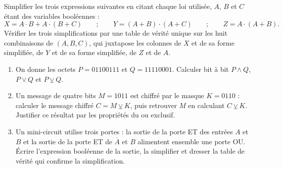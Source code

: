 \begin{exercice}
Simplifier les trois expressions suivantes en citant chaque loi utilisée, $A$, $B$ et $C$ étant des variables booléennes :
\[
X = A \cdot B + A \cdot (B + C) \qquad ; \qquad Y = (A + B) \cdot (A + C) \qquad ; \qquad Z = A \cdot (A + B).
\]
Vérifier les trois simplifications par une table de vérité unique sur les huit combinaisons de $(A, B, C)$, qui juxtapose les colonnes de $X$ et de sa forme simplifiée, de $Y$ et de sa forme simplifiée, de $Z$ et de $A$.
\end{exercice}

\begin{exercice}
\begin{enumerate}
\item On donne les octets $P = 01100111$ et $Q = 11110001$. Calculer bit à bit $P \land Q$, $P \lor Q$ et $P \veebar Q$.
\item Un message de quatre bits $M = 1011$ est chiffré par le masque $K = 0110$ : calculer le message chiffré $C = M \veebar K$, puis retrouver $M$ en calculant $C \veebar K$. Justifier ce résultat par les propriétés du ou exclusif.
\item Un mini-circuit utilise trois portes : la sortie de la porte ET des entrées $A$ et $B$ et la sortie de la porte ET de $\overline{A}$ et $B$ alimentent ensemble une porte OU. Écrire l'expression booléenne de la sortie, la simplifier et dresser la table de vérité qui confirme la simplification.
\end{enumerate}
\end{exercice}

